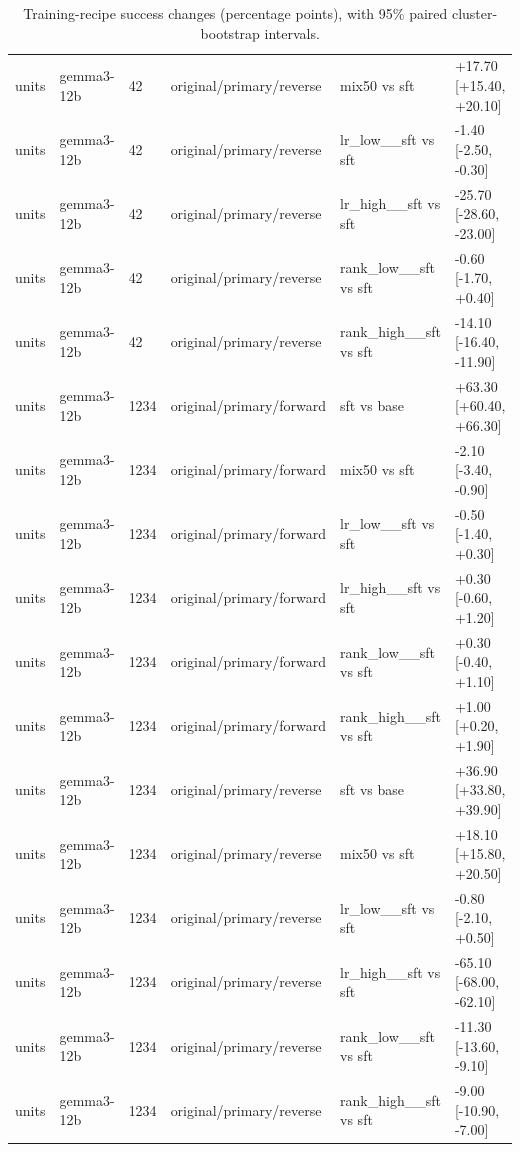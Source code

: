 \begin{table}[t]
\begin{tabular}{llllll}
units & gemma3-12b & 42 & original/primary/reverse & mix50 vs sft & +17.70 [+15.40, +20.10] \\
units & gemma3-12b & 42 & original/primary/reverse & lr\_low\_\_sft vs sft & -1.40 [-2.50, -0.30] \\
units & gemma3-12b & 42 & original/primary/reverse & lr\_high\_\_sft vs sft & -25.70 [-28.60, -23.00] \\
units & gemma3-12b & 42 & original/primary/reverse & rank\_low\_\_sft vs sft & -0.60 [-1.70, +0.40] \\
units & gemma3-12b & 42 & original/primary/reverse & rank\_high\_\_sft vs sft & -14.10 [-16.40, -11.90] \\
units & gemma3-12b & 1234 & original/primary/forward & sft vs base & +63.30 [+60.40, +66.30] \\
units & gemma3-12b & 1234 & original/primary/forward & mix50 vs sft & -2.10 [-3.40, -0.90] \\
units & gemma3-12b & 1234 & original/primary/forward & lr\_low\_\_sft vs sft & -0.50 [-1.40, +0.30] \\
units & gemma3-12b & 1234 & original/primary/forward & lr\_high\_\_sft vs sft & +0.30 [-0.60, +1.20] \\
units & gemma3-12b & 1234 & original/primary/forward & rank\_low\_\_sft vs sft & +0.30 [-0.40, +1.10] \\
units & gemma3-12b & 1234 & original/primary/forward & rank\_high\_\_sft vs sft & +1.00 [+0.20, +1.90] \\
units & gemma3-12b & 1234 & original/primary/reverse & sft vs base & +36.90 [+33.80, +39.90] \\
units & gemma3-12b & 1234 & original/primary/reverse & mix50 vs sft & +18.10 [+15.80, +20.50] \\
units & gemma3-12b & 1234 & original/primary/reverse & lr\_low\_\_sft vs sft & -0.80 [-2.10, +0.50] \\
units & gemma3-12b & 1234 & original/primary/reverse & lr\_high\_\_sft vs sft & -65.10 [-68.00, -62.10] \\
units & gemma3-12b & 1234 & original/primary/reverse & rank\_low\_\_sft vs sft & -11.30 [-13.60, -9.10] \\
units & gemma3-12b & 1234 & original/primary/reverse & rank\_high\_\_sft vs sft & -9.00 [-10.90, -7.00] \\
\bottomrule
\end{tabular}
\caption{Training-recipe success changes (percentage points), with 95\% paired cluster-bootstrap intervals.}
\end{table}
